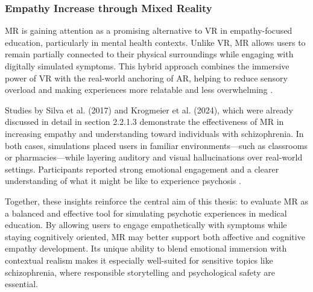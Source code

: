 
\subsubsection{Empathy Increase through Mixed Reality}

MR is gaining attention as a promising alternative to VR in empathy-focused education, particularly in mental health contexts. Unlike VR, MR allows users to remain partially connected to their physical surroundings while engaging with digitally simulated symptoms. This hybrid approach combines the immersive power of VR with the real-world anchoring of AR, helping to reduce sensory overload and making experiences more relatable and less overwhelming \cite{Zare-Bidaki2022}.

Studies by Silva et al. (2017) and Krogmeier et al. (2024), which were already discussed in detail in section 2.2.1.3 demonstrate the effectiveness of MR in increasing empathy and understanding toward individuals with schizophrenia. In both cases, simulations placed users in familiar environments—such as classrooms or pharmacies—while layering auditory and visual hallucinations over real-world settings. Participants reported strong emotional engagement and a clearer understanding of what it might be like to experience psychosis \cite{Silva2017, Krogmeier2024}. 

Together, these insights reinforce the central aim of this thesis: to evaluate MR as a balanced and effective tool for simulating psychotic experiences in medical education. By allowing users to engage empathetically with symptoms while staying cognitively oriented, MR may better support both affective and cognitive empathy development. Its unique ability to blend emotional immersion with contextual realism makes it especially well-suited for sensitive topics like schizophrenia, where responsible storytelling and psychological safety are essential.


